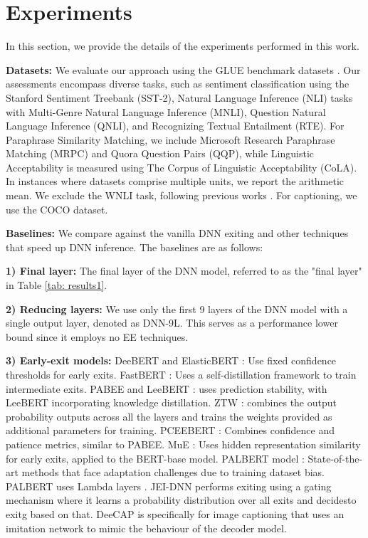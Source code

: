 
\section{Experiments}
In this section, we provide the details of the experiments performed in this work.

{\bf Datasets:}
We evaluate our approach using the GLUE benchmark datasets \citep{wang2019glue}. Our assessments encompass diverse tasks, such as sentiment classification using the Stanford Sentiment Treebank (SST-2), Natural Language Inference (NLI) tasks with Multi-Genre Natural Language Inference (MNLI), Question Natural Language Inference (QNLI), and Recognizing Textual Entailment (RTE). For Paraphrase Similarity Matching, we include Microsoft Research Paraphrase Matching (MRPC) and Quora Question Pairs (QQP), while Linguistic Acceptability is measured using The Corpus of Linguistic Acceptability (CoLA). In instances where datasets comprise multiple units, we report the arithmetic mean. We exclude the WNLI task,  following previous works \citep{devlin2018bert, zhu2021leebert, zhou2020bert}. For captioning, we use the COCO \citep{lin2014microsoft} dataset.



{\bf Baselines:}
We compare against the vanilla DNN exiting and other techniques that speed up DNN inference. The baselines are as follows:


\textbf{1) Final layer:} The final layer of the DNN model, referred to as the "final layer" in Table \ref{tab: results1}.

\textbf{2) Reducing layers:} We use only the first 9 layers of the DNN model with a single output layer, denoted as DNN-9L. This serves as a performance lower bound since it employs no EE techniques.

\textbf{3) Early-exit models:}
DeeBERT \citep{xin2020deebert} and ElasticBERT \citep{liu2021towards}: Use fixed confidence thresholds for early exits.
FastBERT \citep{liu2020fastbert}: Uses a self-distillation framework to train intermediate exits.
PABEE \citep{zhou2020bert} and LeeBERT \citep{zhu2021leebert}: uses prediction stability, with LeeBERT incorporating knowledge distillation. ZTW \citep{sun2021early}: combines the output probability outputs across all the layers and trains the weights provided as additional parameters for training. 
PCEEBERT \citep{zhang2022pcee}: Combines confidence and patience metrics, similar to PABEE.
MuE \citep{tang2023you}: Uses hidden representation similarity for early exits, applied to the BERT-base model.
PALBERT model \citep{balagansky2022palbert}: State-of-the-art methods that face adaptation challenges due to training dataset bias. PALBERT uses Lambda layers \citep{banino2021pondernet}. JEI-DNN \citep{regol2023jointly} performs exiting using a gating mechanism where it learns a probability distribution over all exits and decidesto exitg based on that. DeeCAP \citep{fei2022deecap} is specifically for image captioning that uses an imitation network to mimic the behaviour of the decoder model.

